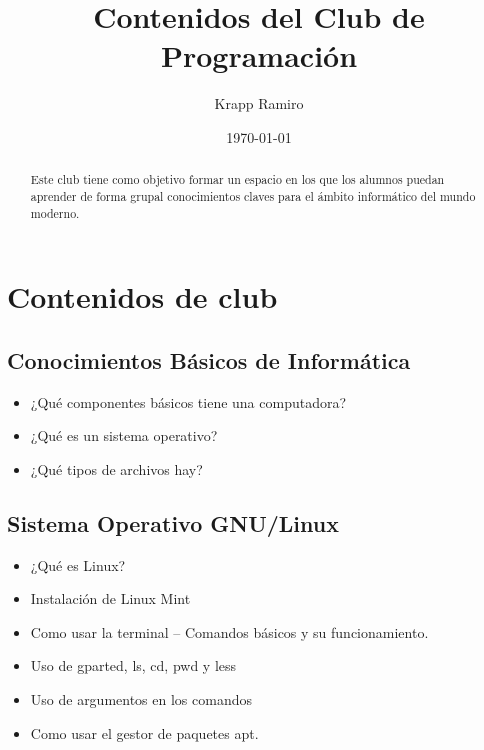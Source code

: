 \documentclass{article}
\title{Contenidos del Club de Programación}
\date{\today}
\author{Krapp Ramiro}
\begin{document}
\maketitle
\thispagestyle{fancy}

\begin{abstract}
	Este club tiene como objetivo formar un espacio en los que los alumnos
	puedan aprender de forma grupal conocimientos claves para el ámbito informático
	del mundo moderno.
\end{abstract}

\section{Contenidos de club}

\subsection{Conocimientos Básicos de Informática}
\begin{itemize}
	\item ¿Qué componentes básicos tiene una computadora?
	\item ¿Qué es un sistema operativo?
	\item ¿Qué tipos de archivos hay?
\end{itemize}

\subsection{Sistema Operativo GNU/Linux}
\begin{itemize}
	\item ¿Qué es Linux?
	\item Instalación de Linux Mint
	\item Como usar la terminal -- Comandos básicos y su funcionamiento.
	\item Uso de gparted, ls, cd, pwd y less
	\item Uso de argumentos en los comandos
	\item Como usar el gestor de paquetes apt.
\end{itemize}

\thispagestyle{fancy}
\end{document}
